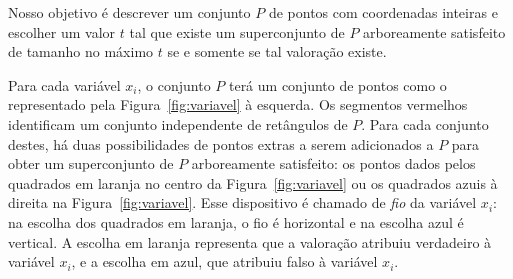 Nosso objetivo é descrever um conjunto $P$ de pontos com coordenadas inteiras e escolher um valor $t$ tal que existe um superconjunto de $P$ arboreamente satisfeito de tamanho no máximo $t$ se e somente se tal valoração existe.

Para cada variável $x_i$, o conjunto $P$ terá um conjunto de pontos como o representado pela Figura~\ref{fig:variavel} à esquerda. Os segmentos vermelhos identificam um conjunto independente de retângulos de $P$. Para cada conjunto destes, há duas possibilidades de pontos extras a serem adicionados a $P$ para obter um superconjunto de $P$ arboreamente satisfeito: os pontos dados pelos quadrados em laranja no centro da Figura~\ref{fig:variavel} ou os quadrados azuis à direita na Figura~\ref{fig:variavel}. Esse dispositivo é chamado de \textit{fio} da variável $x_i$: na escolha dos quadrados em laranja, o fio é horizontal e na escolha azul é vertical. A escolha em laranja representa que a valoração atribuiu verdadeiro à variável $x_i$, e a escolha em azul, que atribuiu falso à variável $x_i$. 

